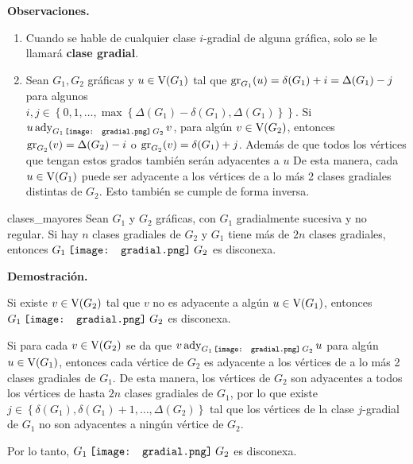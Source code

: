 \documentclass[fleqn, 11pt]{beamer}
\newcommand{\gradial}{\hspace{0.9mm} \texttt{[image: gradial.png]} \hspace{1mm}}
\begin{document}
    \textbf{Observaciones.}

    \begin{enumerate}[1.]
        \item  Cuando se hable de cualquier clase $ i $-gradial de alguna gráfica, solo se le llamará \textbf{clase gradial}.
        \item Sean $ G_1, G_2 $ gráficas y $ u \in \textnormal{V}(G_1) $ tal que $ \textnormal{gr}_{G_1}(u) = \delta(G_1) + i = \Delta(G_1) - j $ para algunos \\ $ i, j \in \left\lbrace 0, 1, \ldots, \max\left\lbrace \Delta(G_1) - \delta(G_1), \Delta(G_1) \right\rbrace \right\rbrace $. Si $ u \, \textnormal{ady}_{G_1 \! \gradial \! G_2} \, v $, para algún $ v \in \textnormal{V}(G_2) $, entonces $ \textnormal{gr}_{G_2}(v) = \Delta(G_2) - i $ o $ \textnormal{gr}_{G_2}(v) = \delta(G_1) + j $. Además de que todos los vértices que tengan estos grados también serán adyacentes a $ u $ De esta manera, cada $ u \in \textnormal{V}(G_1) $ puede ser adyacente a los vértices de a lo más 2 clases gradiales distintas de $ G_2 $. Esto también se cumple de forma inversa.
    \end{enumerate}

    \begin{teorema}{}{clases_mayores}
        Sean $ G_1 $ y $ G_2 $ gráficas, con $ G_1 $ gradialmente sucesiva y no regular. Si hay $ n $ clases gradiales de $ G_2 $ y $ G_1 $ tiene más de $ 2n $ clases gradiales, entonces $ G_1 \gradial G_2 $ es disconexa.

        \tcblower

        \textbf{Demostración.} \vspace{3mm}

        \begin{list}{\bfseries Caso 1.}{ \addtolength{\itemindent}{-5mm}%
            \addtolength{\labelsep}{0mm}%
            \addtolength{\leftmargin}{-5mm}%
            \addtolength{\labelwidth}{-1cm} }
            \item Si existe $ v \in \textnormal{V}(G_2) $ tal que $ v $ no es adyacente a algún $ u \in \textnormal{V}(G_1) $, entonces $ G_1 \gradial G_2 $ es disconexa. \vspace{2mm}
            \item Si para cada $ v \in \textnormal{V}(G_2) $ se da que $ v \, \textnormal{ady}_{G_1 \! \gradial \! G_2} \, u $ para algún $ u \in \textnormal{V}(G_1) $, entonces cada vértice de $ G_2 $ es adyacente a los vértices de a lo más 2 clases gradiales de $ G_1 $. De esta manera, los vértices de $ G_2 $ son adyacentes a todos los vértices de hasta $ 2n $ clases gradiales de $ G_1 $, por lo que existe $ j \in \left\lbrace \delta(G_1), \delta(G_1) + 1, \ldots, \Delta(G_2) \right\rbrace $ tal que los vértices de la clase $ j $-gradial de $ G_1 $ no son adyacentes a ningún vértice de $ G_2 $. 

            Por lo tanto, $ G_1 \gradial G_2 $ es disconexa.
        \end{list}
    \end{teorema}
\end{document}
